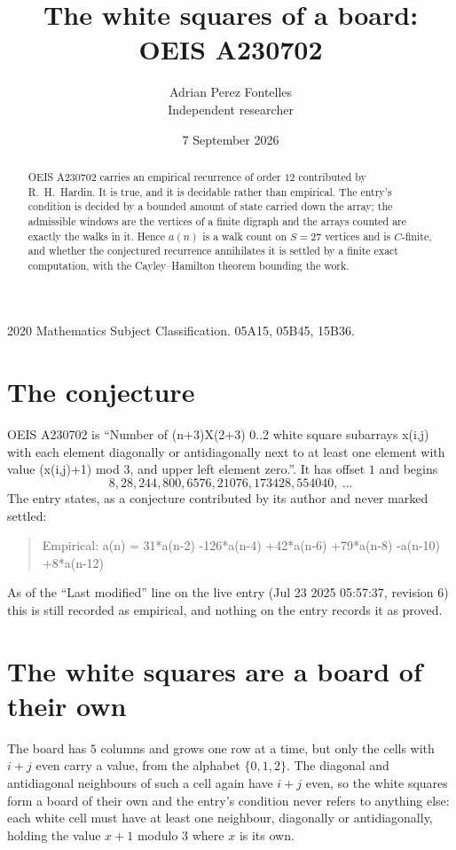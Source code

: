 \documentclass[11pt,a4paper]{article}
\title{The white squares of a board: OEIS A230702}
\author{Adrian Perez Fontelles\\ \small Independent researcher}
\date{7 September 2026}
\theoremstyle{plain}
\theoremstyle{definition}
\begin{document}
\maketitle

\begin{abstract}
OEIS A230702 carries an empirical recurrence of order $12$ contributed by R.~H.~Hardin. It is
true, and it is decidable rather than empirical. The entry's condition is decided by a bounded amount of state carried down the array; the
admissible windows are the vertices of a finite digraph and the arrays counted are exactly the
walks in it. Hence $a(n)$ is a walk count on $S=27$ vertices and is $C$-finite, and whether the
conjectured recurrence annihilates it is settled by a finite exact computation, with the
Cayley--Hamilton theorem bounding the work.
\end{abstract}

\noindent\small 2020 Mathematics Subject Classification. 05A15, 05B45, 15B36.\normalsize

\section{The conjecture}

OEIS A230702 is ``Number of (n+3)X(2+3) 0..2 white square subarrays x(i,j) with each element diagonally or antidiagonally next to at least one element with value (x(i,j)+1) mod 3, and upper left element zero.''. It has offset $1$ and begins
\[
8, 28, 244, 800, 6576, 21076, 173428, 554040,\ \dots
\]
The entry states, as a conjecture contributed by its author and never marked settled:
\begin{quote}
Empirical: a(n) = 31*a(n-2) -126*a(n-4) +42*a(n-6) +79*a(n-8) -a(n-10) +8*a(n-12)
\end{quote}
As of the ``Last modified'' line on the live entry (Jul 23 2025 05:57:37, revision 6) this is still
recorded as empirical, and nothing on the entry records it as proved.

\section{The white squares are a board of their own}

The board has $5$ columns and grows one row at a time, but only the cells with $i+j$ even carry a value, from the alphabet $\{0,1,2\}$. The diagonal and antidiagonal neighbours of such a cell again have $i+j$ even, so the white squares form a board of their own and the entry's condition never refers to anything else: each white cell must have at least one neighbour, diagonally or antidiagonally, holding the value $x+1$ modulo $3$ where $x$ is its own.
\end{document}
